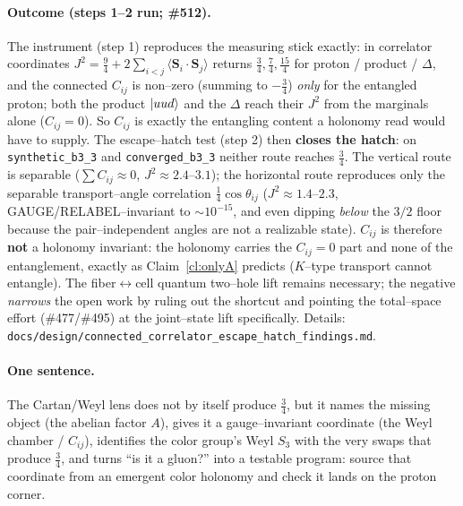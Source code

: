 \documentclass[11pt,oneside]{article}
\newcommand{\expval}[1]{\langle #1 \rangle}
\newcommand{\code}[1]{\texttt{#1}}
\theoremstyle{plain}
\begin{document}
\paragraph{Outcome (steps 1--2 run; \#512).}
The instrument (step 1) reproduces the measuring stick exactly: in correlator
coordinates $J^2=\tfrac94+2\sum_{i<j}\expval{\bm S_i\!\cdot\!\bm S_j}$ returns
$\tfrac34,\tfrac74,\tfrac{15}{4}$ for proton / product / $\Delta$, and the
connected $C_{ij}$ is non--zero (summing to $-\tfrac34$) \emph{only} for the
entangled proton; both the product $\ket{uud}$ and the $\Delta$ reach their $J^2$
from the marginals alone ($C_{ij}=0$). So $C_{ij}$ is exactly the entangling
content a holonomy read would have to supply. The escape--hatch test (step 2) then
\textbf{closes the hatch}: on \code{synthetic\_b3\_3} and \code{converged\_b3\_3}
neither route reaches $\tfrac34$. The vertical route is separable
($\sum C_{ij}\approx0$, $J^2\approx2.4$--$3.1$); the horizontal route reproduces
only the separable transport--angle correlation $\tfrac14\cos\theta_{ij}$
($J^2\approx1.4$--$2.3$, GAUGE/RELABEL--invariant to ${\sim}10^{-15}$, and even
dipping \emph{below} the $3/2$ floor because the pair--independent angles are not a
realizable state). $C_{ij}$ is therefore \textbf{not} a holonomy invariant: the
holonomy carries the $C_{ij}=0$ part and none of the entanglement, exactly as
Claim~\ref{cl:onlyA} predicts ($K$--type transport cannot entangle). The
fiber$\leftrightarrow$cell quantum two--hole lift remains necessary; the negative
\emph{narrows} the open work by ruling out the shortcut and pointing the
total--space effort (\#477/\#495) at the joint--state lift specifically. Details:
\code{docs/design/connected\_correlator\_escape\_hatch\_findings.md}.

\paragraph{One sentence.}
The Cartan/Weyl lens does not by itself produce $\tfrac34$, but it names the
missing object (the abelian factor $A$), gives it a gauge--invariant coordinate
(the Weyl chamber / $C_{ij}$), identifies the color group's Weyl $S_3$ with the
very swaps that produce $\tfrac34$, and turns ``is it a gluon?'' into a testable
program: source that coordinate from an emergent color holonomy and check it lands
on the proton corner.
\end{document}
